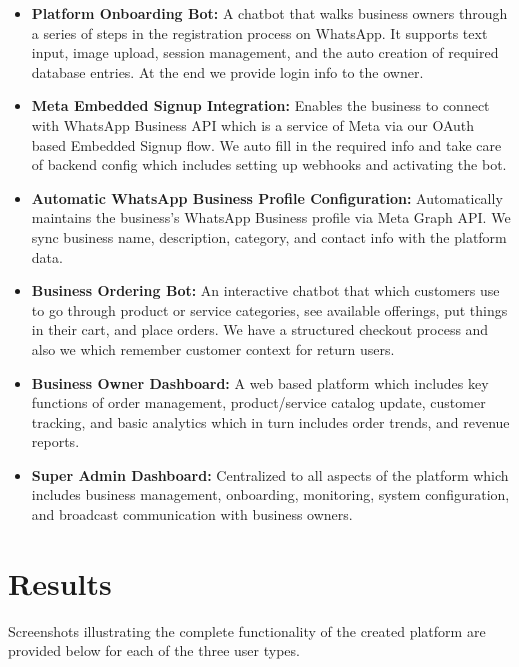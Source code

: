 \begin{itemize}

\item \textbf{Platform Onboarding Bot:}
A chatbot that walks business owners through a series of steps in the registration process on WhatsApp. It supports text input, image upload, session management, and the auto creation of required database entries. At the end we provide login info to the owner.

\item \textbf{Meta Embedded Signup Integration:}
Enables the business to connect with WhatsApp Business API which is a service of Meta via our OAuth based Embedded Signup flow. We auto fill in the required info and take care of backend config which includes setting up webhooks and activating the bot.

\item \textbf{Automatic WhatsApp Business Profile Configuration:}
Automatically maintains the business's WhatsApp Business profile via Meta Graph API. We sync business name, description, category, and contact info with the platform data.

\item \textbf{Business Ordering Bot:}
An interactive chatbot that which customers use to go through product or service categories, see available offerings, put things in their cart, and place orders. We have a structured checkout process and also we which remember customer context for return users.

\item \textbf{Business Owner Dashboard:}
A web based platform which includes key functions of order management, product/service catalog update, customer tracking, and basic analytics which in turn includes order trends, and revenue reports.

\item \textbf{Super Admin Dashboard:}
Centralized to all aspects of the platform which includes business management, onboarding, monitoring, system configuration, and broadcast communication with business owners.

\end{itemize}


\section{Results}

Screenshots illustrating the complete functionality of the created platform are provided below for each of the three user types.


